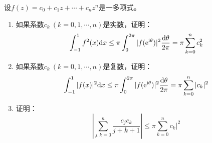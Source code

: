 \begin{proposition}

    设$f(z) = c_0 + c_1 z + \cdots + c_n z^n$是一多项式。

    \begin{enumerate}

        \item 
            如果系数$c_k\ (k = 0, 1, \cdots, n)$是实数，证明：
            $$\int_{-1}^{1}{f^2(x)}\mathrm{d} x \leq \pi \int_{0}^{2\pi}{|f(\mathrm{e}^{\mathrm{i} \theta})|^2}\dfrac{\mathrm{d} \theta}{2 \pi} = \pi \sum\limits_{k = 0}^{n}{c_k^2}$$

        \item 
            如果系数$c_k\ (k = 0, 1, \cdots, n)$是复数，证明：
            $$\int_{-1}^{1}{|f(x)|^2}\mathrm{d} x \leq \pi \int_{0}^{2\pi}{|f(\mathrm{e}^{\mathrm{i} \theta})|^2}\dfrac{\mathrm{d} \theta}{2 \pi} = \pi \sum\limits_{k = 0}^{n}{|c_k|^2}$$
        
        \item 
            证明：
            $$\left| \sum\limits_{j, k = 0}^{n}{\dfrac{c_j c_k}{j + k + 1}} \right| \leq \pi \sum\limits_{k = 0}^{n}{c_k|^2}$$

    \end{enumerate}

\end{proposition}

